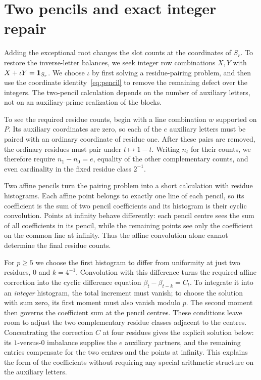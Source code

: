 \section{Two pencils and exact integer repair}\label{sec:repair}
Adding the exceptional root changes the slot counts at the coordinates of $S_r$. To restore the inverse-letter balances, we seek integer row combinations $X,Y$ with $X+\iota Y=\mathbf1_{S_r}$. We choose $\iota$ by first solving a residue-pairing problem, and then use the coordinate identity~\eqref{eq:pencil} to remove the remaining defect over the integers. The two-pencil calculation depends on the number of auxiliary letters, not on an auxiliary-prime realization of the blocks.

To see the required residue counts, begin with a line combination $w$ supported on $P$. Its auxiliary coordinates are zero, so each of the $e$ auxiliary letters must be paired with an ordinary coordinate of residue one. After these pairs are removed, the ordinary residues must pair under $t\mapsto1-t$. Writing $n_t$ for their counts, we therefore require $n_1-n_0=e$, equality of the other complementary counts, and even cardinality in the fixed residue class $2^{-1}$.

Two affine pencils turn the pairing problem into a short calculation with residue histograms. Each affine point belongs to exactly one line of each pencil, so its coefficient is the sum of two pencil coefficients and its histogram is their cyclic convolution. Points at infinity behave differently: each pencil centre sees the sum of all coefficients in its pencil, while the remaining points see only the coefficient on the common line at infinity. Thus the affine convolution alone cannot determine the final residue counts.

For $p\ge5$ we choose the first histogram to differ from uniformity at just two residues, $0$ and $k=4^{-1}$. Convolution with this difference turns the required affine correction into the cyclic difference equation $\beta_t-\beta_{t-k}=C_t$. To integrate it into an \emph{integer} histogram, the total increment must vanish; to choose the solution with sum zero, its first moment must also vanish modulo $p$. The second moment then governs the coefficient sum at the pencil centres. These conditions leave room to adjust the two complementary residue classes adjacent to the centres. Concentrating the correction $C$ at four residues gives the explicit solution below: its $1$-versus-$0$ imbalance supplies the $e$ auxiliary partners, and the remaining entries compensate for the two centres and the points at infinity. This explains the form of the coefficients without requiring any special arithmetic structure on the auxiliary letters.


